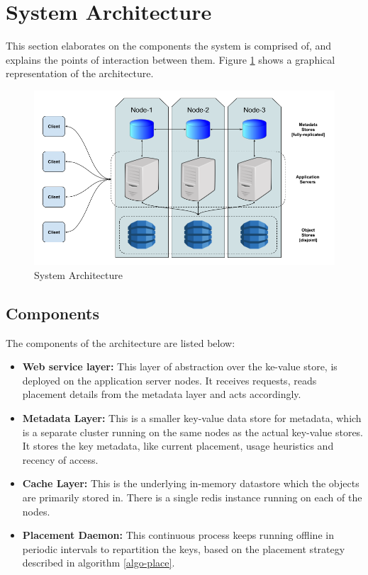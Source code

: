 \documentclass{sig-alternate}
\begin{document}
\section{System Architecture}
This section elaborates on the components the system is comprised of, and explains the points of interaction between them. Figure \ref{fig:sysarch} shows a graphical representation of the architecture.\\

\begin{figure}
\centering
\includegraphics[width=\textwidth]{images/SystemArchitecture.png}
\caption{System Architecture}
\label{fig:sysarch}
\end{figure}

\subsection{Components}
The components of the architecture are listed below:
\begin{itemize}
	\item \textbf{Web service layer:} This layer of abstraction over the ke-value store, is deployed on the application server nodes. It receives requests, reads placement details from the metadata layer and acts accordingly.
	\item \textbf{Metadata Layer:} This is a smaller key-value data store for metadata, which is a separate cluster running on the same nodes as the actual key-value stores. It stores the key metadata, like current placement, usage heuristics and recency of access.
	\item \textbf{Cache Layer:} This is the underlying in-memory datastore which the objects are primarily stored in. There is a single redis instance running on each of the nodes.
	\item \textbf{Placement Daemon:} This continuous process keeps running offline in periodic intervals to repartition the keys, based on the placement strategy described in algorithm \ref{algo-place}.
\end{itemize}
\end{document}
